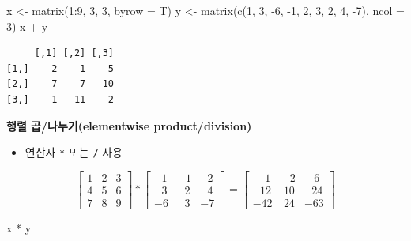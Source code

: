 \documentclass[
  11pt,
]{krantz}
\newenvironment{Shaded}{\begin{snugshade}}{\end{snugshade}}
\newcommand{\AttributeTok}[1]{\textcolor[rgb]{0.61,0.61,0.61}{#1}}
\newcommand{\DecValTok}[1]{\textcolor[rgb]{0.06,0.06,0.06}{#1}}
\newcommand{\FunctionTok}[1]{\textcolor[rgb]{0,0,0}{#1}}
\newcommand{\NormalTok}[1]{#1}
\newcommand{\OtherTok}[1]{\textcolor[rgb]{0.37,0.37,0.37}{#1}}
\newcommand{\SpecialCharTok}[1]{\textcolor[rgb]{0,0,0}{#1}}
\providecommand{\tightlist}{%
  \setlength{\itemsep}{0pt}\setlength{\parskip}{0pt}}
\begin{document}
\begin{Shaded}
\begin{Highlighting}[]
\NormalTok{x }\OtherTok{\textless{}{-}} \FunctionTok{matrix}\NormalTok{(}\DecValTok{1}\SpecialCharTok{:}\DecValTok{9}\NormalTok{, }\DecValTok{3}\NormalTok{, }\DecValTok{3}\NormalTok{, }\AttributeTok{byrow =}\NormalTok{ T)}
\NormalTok{y }\OtherTok{\textless{}{-}} \FunctionTok{matrix}\NormalTok{(}\FunctionTok{c}\NormalTok{(}\DecValTok{1}\NormalTok{, }\DecValTok{3}\NormalTok{, }\SpecialCharTok{{-}}\DecValTok{6}\NormalTok{, }\SpecialCharTok{{-}}\DecValTok{1}\NormalTok{, }\DecValTok{2}\NormalTok{, }\DecValTok{3}\NormalTok{, }\DecValTok{2}\NormalTok{, }\DecValTok{4}\NormalTok{, }\SpecialCharTok{{-}}\DecValTok{7}\NormalTok{), }\AttributeTok{ncol =} \DecValTok{3}\NormalTok{)}
\NormalTok{x }\SpecialCharTok{+}\NormalTok{ y}
\end{Highlighting}
\end{Shaded}

\begin{verbatim}
     [,1] [,2] [,3]
[1,]    2    1    5
[2,]    7    7   10
[3,]    1   11    2
\end{verbatim}

\normalsize

\textbf{행렬 곱/나누기(elementwise product/division)}

\begin{itemize}
\tightlist
\item
  연산자 \texttt{*} 또는 \texttt{/} 사용
\end{itemize}

\[\begin{bmatrix}
1 & 2 & 3 \\
4 & 5 & 6 \\ 
7 & 8 & 9
\end{bmatrix} *  
\begin{bmatrix}
~~~1 & -1 &  ~~~2 \\
~~~3 & ~~~2 & ~~~4 \\ 
-6 & ~~~3 & -7
\end{bmatrix} 
 = 
\begin{bmatrix}
~~~~~ 1  & -2  &  ~~~~6 \\
~~~  12  & ~10 &  ~~~24 \\ 
    -42  & ~24 & -63
\end{bmatrix}
\]

\footnotesize

\begin{Shaded}
\begin{Highlighting}[]
\NormalTok{x }\SpecialCharTok{*}\NormalTok{ y}
\end{Highlighting}
\end{Shaded}
\end{document}
